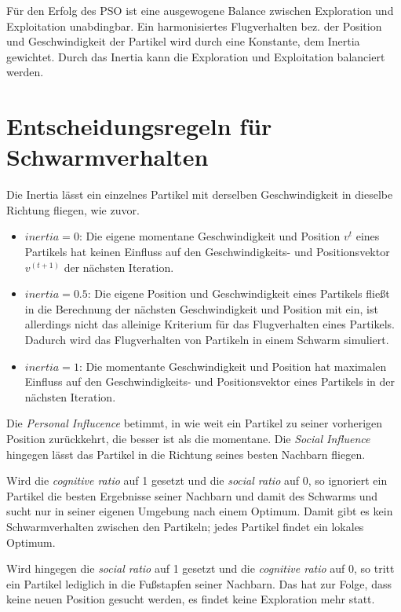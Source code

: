 Für den Erfolg des PSO ist eine ausgewogene Balance zwischen Exploration und
Exploitation unabdingbar. Ein harmonisiertes Flugverhalten bez. der Position
und Geschwindigkeit der Partikel wird durch eine Konstante, dem Inertia
gewichtet. Durch das Inertia kann die Exploration und Exploitation balanciert
werden. 

\section{Entscheidungsregeln für Schwarmverhalten}

Die Inertia lässt ein einzelnes Partikel mit derselben Geschwindigkeit in
dieselbe Richtung fliegen, wie zuvor.
\begin{itemize}
    \item $inertia = 0$: Die eigene momentane Geschwindigkeit und Position
        $v^t$ eines Partikels hat keinen Einfluss auf den Geschwindigkeits-
        und Positionsvektor $v^{(t+1)}$ der nächsten Iteration.
    \item $inertia = 0.5$: Die eigene Position und Geschwindigkeit eines
        Partikels fließt in die Berechnung der nächsten Geschwindigkeit und
        Position mit ein, ist allerdings nicht das alleinige Kriterium für
        das Flugverhalten eines Partikels. Dadurch wird das Flugverhalten
        von Partikeln in einem Schwarm simuliert.
    \item $inertia = 1$: Die momentante Geschwindigkeit und Position hat
        maximalen Einfluss auf den Geschwindigkeits- und Positionsvektor
        eines Partikels in der nächsten Iteration.
\end{itemize}

Die \emph{Personal Influcence} betimmt, in wie weit ein Partikel zu seiner
vorherigen Position zurückkehrt, die besser ist als die momentane.
Die \emph{Social Influence} hingegen lässt das Partikel in die Richtung
seines besten Nachbarn fliegen.

Wird die \emph{cognitive ratio} auf 1 gesetzt und die \emph{social ratio}
auf 0, so ignoriert ein Partikel die besten Ergebnisse seiner Nachbarn und
damit des Schwarms und sucht nur in seiner eigenen Umgebung nach einem
Optimum. Damit gibt es kein Schwarmverhalten zwischen den Partikeln; jedes
Partikel findet ein lokales Optimum.

Wird hingegen die \emph{social ratio} auf 1 gesetzt und die \emph{cognitive
ratio} auf 0, so tritt ein Partikel lediglich in die Fußstapfen seiner
Nachbarn. Das hat zur Folge, dass keine neuen Position gesucht werden, es
findet keine Exploration mehr statt.

